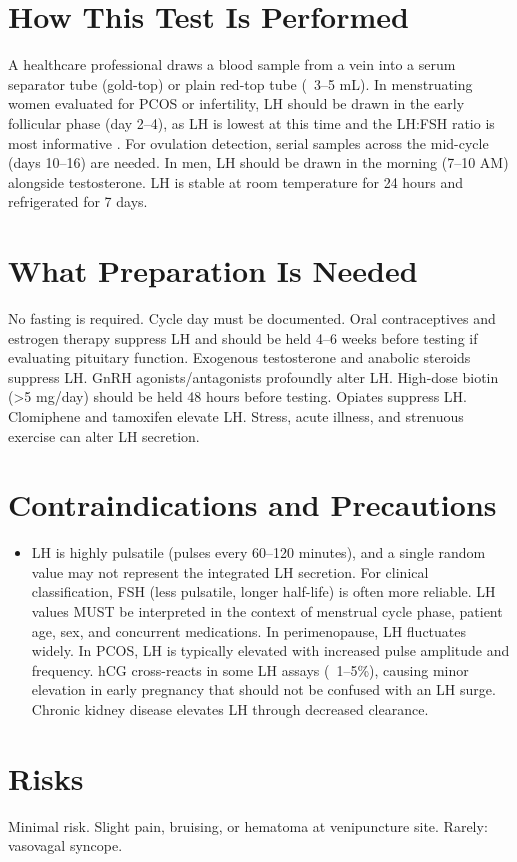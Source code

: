 \section*{How This Test Is Performed}
A healthcare professional draws a blood sample from a vein into a serum separator tube (gold-top) or plain red-top tube (~3--5 mL). In menstruating women evaluated for PCOS or infertility, LH should be drawn in the early follicular phase (day 2--4), as LH is lowest at this time and the LH:FSH ratio is most informative \cite{mihm2011normal}. For ovulation detection, serial samples across the mid-cycle (days 10--16) are needed. In men, LH should be drawn in the morning (7--10 AM) alongside testosterone. LH is stable at room temperature for 24 hours and refrigerated for 7 days.

\section*{What Preparation Is Needed}
No fasting is required. Cycle day must be documented. Oral contraceptives and estrogen therapy suppress LH and should be held 4--6 weeks before testing if evaluating pituitary function. Exogenous testosterone and anabolic steroids suppress LH. GnRH agonists/antagonists profoundly alter LH. High-dose biotin (>5 mg/day) should be held 48 hours before testing. Opiates suppress LH. Clomiphene and tamoxifen elevate LH. Stress, acute illness, and strenuous exercise can alter LH secretion.

\section*{Contraindications and Precautions}
\begin{itemize}
  \item LH is highly pulsatile (pulses every 60--120 minutes), and a single random value may not represent the integrated LH secretion. For clinical classification, FSH (less pulsatile, longer half-life) is often more reliable. LH values MUST be interpreted in the context of menstrual cycle phase, patient age, sex, and concurrent medications. In perimenopause, LH fluctuates widely. In PCOS, LH is typically elevated with increased pulse amplitude and frequency. hCG cross-reacts in some LH assays (~1--5\%), causing minor elevation in early pregnancy that should not be confused with an LH surge. Chronic kidney disease elevates LH through decreased clearance.
\end{itemize}
\section*{Risks}
Minimal risk. Slight pain, bruising, or hematoma at venipuncture site. Rarely: vasovagal syncope.

